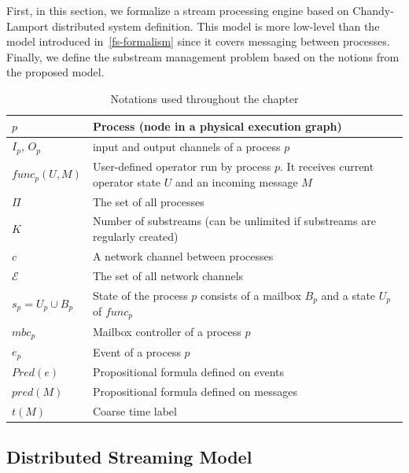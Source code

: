 First, in this section, we formalize a stream processing engine based on Chandy-Lamport distributed system definition. This model is more low-level than the model introduced in~\ref{fs-formalism} since it covers messaging between processes. Finally, we define the substream management problem based on the notions from the proposed model.

\begin{table}[!b]
\begin {center}
    \caption{Notations used throughout the chapter}
    \footnotesize
    \begin{tabular}{l|p{8.5cm}}
        \hline
        $p$ & Process (node in a physical execution graph) \\ 
        \hline
        $I_p$, $O_p$ & input and output channels of a process $p$ \\ 
        \hline
        $func_p(U, M)$ & User-defined operator run by process $p$. It receives current operator state $U$ and an incoming message $M$ \\ 
        \hline
        $\Pi$ & The set of all processes  \\
        \hline
        $K$ & Number of substreams (can be unlimited if substreams are regularly created) \\
        \hline
        $c$ & A network channel between processes  \\
        \hline
        $\mathcal{E}$ & The set of all network channels  \\
        \hline
        $s_p = U_p \cup B_p$ & State of the process $p$ consists of a mailbox $B_p$ and a state $U_p$ of $func_p$ \\
        \hline
        $mbc_{p}$ & Mailbox controller of a process $p$ \\
        \hline
        $e_{p}$ & Event of a process $p$ \\
        \hline
        $Pred(e)$ & Propositional formula defined on events \\
        \hline
        $pred(M)$ & Propositional formula defined on messages\\
        \hline
        $t(M)$ & Coarse time label \\
    \end{tabular}
    \label{notations-substreams}
\end {center}
\end{table}

\subsection{Distributed Streaming Model}
\label{fs-acker-spe-model}

